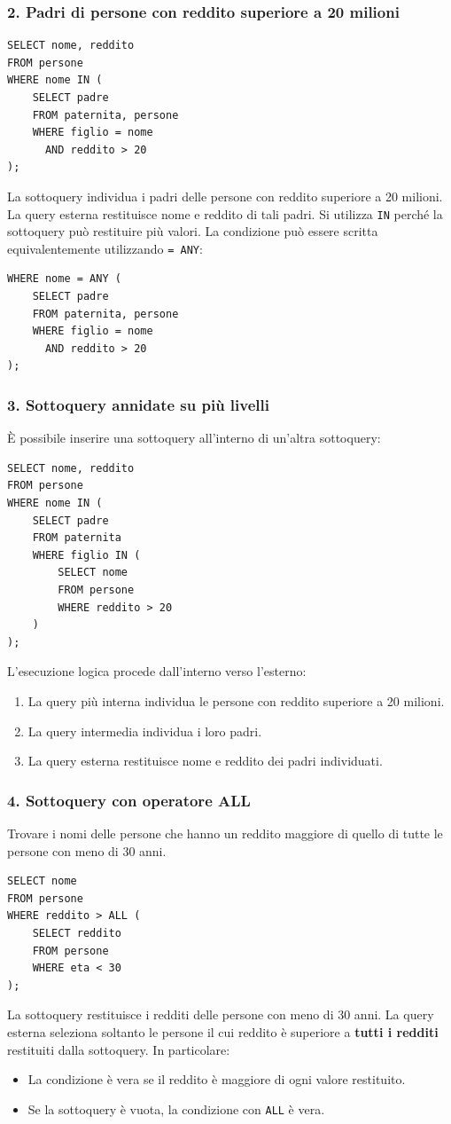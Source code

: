 \subsubsection*{2. Padri di persone con reddito superiore a 20 milioni}
\begin{verbatim}
SELECT nome, reddito
FROM persone
WHERE nome IN (
    SELECT padre
    FROM paternita, persone
    WHERE figlio = nome
      AND reddito > 20
);
\end{verbatim}
La sottoquery individua i padri delle persone con reddito superiore a 20 milioni.
La query esterna restituisce nome e reddito di tali padri.
Si utilizza \texttt{IN} perché la sottoquery può restituire più valori.
La condizione può essere scritta equivalentemente utilizzando \texttt{= ANY}:
\begin{verbatim}
WHERE nome = ANY (
    SELECT padre
    FROM paternita, persone
    WHERE figlio = nome
      AND reddito > 20
);
\end{verbatim}
\subsubsection*{3. Sottoquery annidate su più livelli}
È possibile inserire una sottoquery all'interno di un'altra sottoquery:
\begin{verbatim}
SELECT nome, reddito
FROM persone
WHERE nome IN (
    SELECT padre
    FROM paternita
    WHERE figlio IN (
        SELECT nome
        FROM persone
        WHERE reddito > 20
    )
);
\end{verbatim}
L'esecuzione logica procede dall'interno verso l'esterno:
\begin{enumerate}
    \item La query più interna individua le persone con reddito superiore a 20 milioni.
    \item La query intermedia individua i loro padri.
    \item La query esterna restituisce nome e reddito dei padri individuati.
\end{enumerate}
\subsubsection*{4. Sottoquery con operatore ALL}
Trovare i nomi delle persone che hanno un reddito maggiore di quello di tutte le persone con meno di 30 anni.
\begin{verbatim}
SELECT nome
FROM persone
WHERE reddito > ALL (
    SELECT reddito
    FROM persone
    WHERE eta < 30
);
\end{verbatim}
La sottoquery restituisce i redditi delle persone con meno di 30 anni.
La query esterna seleziona soltanto le persone il cui reddito è superiore a \textbf{tutti i redditi} restituiti dalla sottoquery.
In particolare:
\begin{itemize}
    \item La condizione è vera se il reddito è maggiore di ogni valore restituito.
    \item Se la sottoquery è vuota, la condizione con \texttt{ALL} è vera.
\end{itemize}
